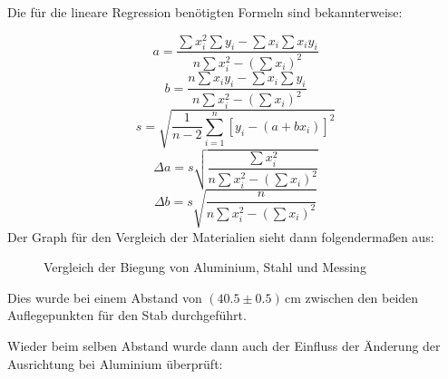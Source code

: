 \documentclass[11pt,a4paper]{article}
\begin{document}
Die f\"ur die lineare Regression ben\"otigten Formeln sind bekannterweise:

\begin{equation}
a=\frac{\sum x_i^2\sum y_i-\sum x_i\sum x_iy_i}{n\sum x_i^2-(\sum x_i)^2}
\end{equation}
\begin{equation}
b=\frac{n\sum x_iy_i-\sum x_i\sum y_i}{n\sum x_i^2-(\sum x_i)^2}
\end{equation}
\begin{equation}
s=\sqrt{\frac{1}{n-2}\sum^n_{i=1}[y_i-(a+bx_i)]^2}
\end{equation}
\begin{equation}
\Delta a=s\sqrt{\frac{\sum x_i^2}{n\sum x_i^2-(\sum x_i)^2}}
\end{equation}
\begin{equation}
\Delta b=s\sqrt{\frac{n}{n\sum x_i^2-(\sum x_i)^2}}
\end{equation}
\pagebreak
Der Graph f\"ur den Vergleich der Materialien sieht dann folgenderma\ss en aus:

\begin{figure}[h]
\centering
{}
\renewcommand\thefigure{1}
\caption[Vergleich der Biegung von Aluminium, Stahl und Messing]{Vergleich der Biegung von Aluminium, Stahl und Messing}
\label{Abb:1}
\end{figure}

Dies wurde bei einem Abstand von $(40.5\pm0.5)$\,cm zwischen den beiden Auflegepunkten f\"ur den Stab durchgef\"uhrt.

\pagebreak

Wieder beim selben Abstand wurde dann auch der Einfluss der \"Anderung der Ausrichtung bei Aluminium \"uberpr\"uft:
\end{document}
